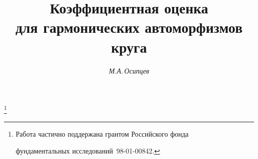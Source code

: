 

 


% 


 


\newcommand{\re}{\operatorname{Re}} 


\newcommand{\im}{\operatorname{Im}} 


\newcommand{\tts}[1]{} 


 




\setcounter{page}{42} 












 


\author{\it М.А.\,Осипцев} 




\title{ Коэффициентная оценка \\ 


для гармонических автоморфизмов круга} 


\thanks{Работа частично поддержана грантом Российского фонда 


фундаментальных исследований \No\,98-01-00842.} 


 


\date{} 




\pagestyle{plain} %


 




